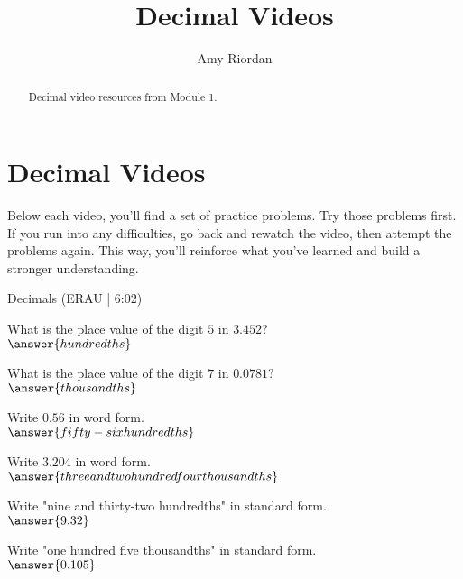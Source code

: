 \documentclass{ximera}
\title{Decimal Videos}
\author{Amy Riordan}
\begin{document}
\begin{abstract}
Decimal video resources from Module 1.
\end{abstract}
\maketitle

\section*{Decimal Videos}

Below each video, you’ll find a set of practice problems. Try those problems first. If you run into any difficulties, go back and rewatch the video, then attempt the problems again. This way, you’ll reinforce what you’ve learned and build a stronger understanding.

Decimals (ERAU | 6:02)



\begin{problem}
What is the place value of the digit $5$ in $3.452$?\\
$\answer{hundredths}$
\end{problem}

\begin{problem}
What is the place value of the digit $7$ in $0.0781$?\\
$\answer{thousandths}$
\end{problem}

\begin{problem}
Write $0.56$ in word form.\\
$\answer{fifty-six hundredths}$
\end{problem}

\begin{problem}
Write $3.204$ in word form.\\
$\answer{three and two hundred four thousandths}$
\end{problem}

\begin{problem}
Write "nine and thirty-two hundredths" in standard form.\\
$\answer{9.32}$
\end{problem}

\begin{problem}
Write "one hundred five thousandths" in standard form.\\
$\answer{0.105}$
\end{problem}
\end{document}
